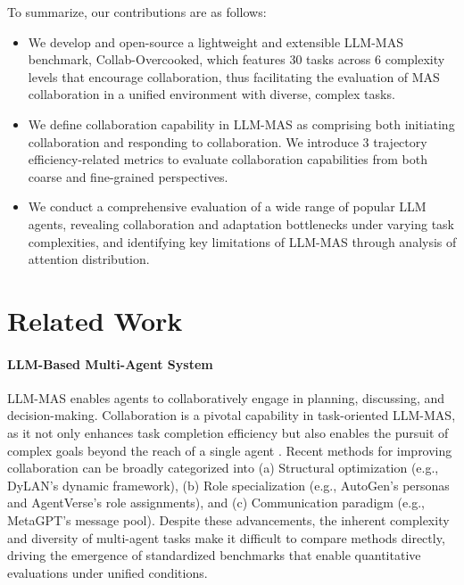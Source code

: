 \documentclass[11pt]{article}
\begin{document}
To summarize, our contributions are as follows:
\begin{itemize} 
\item[$\bullet$] We develop and open-source a lightweight and extensible LLM-MAS benchmark, Collab-Overcooked, which features 30 tasks across 6 complexity levels that encourage collaboration, thus facilitating the evaluation of MAS collaboration in a unified environment with diverse, complex tasks.

\item[$\bullet$] We define collaboration capability in LLM-MAS as comprising both initiating collaboration and responding to collaboration. We introduce 3 trajectory efficiency-related metrics to evaluate collaboration capabilities from both coarse and fine-grained perspectives.

\item[$\bullet$] We conduct a comprehensive evaluation of a wide range of popular LLM agents, revealing collaboration and adaptation bottlenecks under varying task complexities, and identifying key limitations of LLM-MAS through analysis of attention distribution.
\end{itemize}







\section{Related Work}

\paragraph{LLM-Based Multi-Agent System}

LLM-MAS enables agents to collaboratively engage in planning, discussing,  and decision-making. Collaboration is a pivotal capability in task-oriented LLM-MAS, as it not only enhances task completion efficiency \cite{zhang2024towards,tao2024github} but also enables the pursuit of complex goals beyond the reach of a single agent \cite{park2023generative,hong2023metagpt}. Recent methods for improving collaboration can be broadly categorized into (a) Structural optimization (e.g., DyLAN’s \cite{liu2023dynamic} dynamic framework), (b) Role specialization (e.g., AutoGen’s \cite{wu2023autogen} personas and AgentVerse's \cite{chen2023agentverse} role assignments), and (c) Communication paradigm (e.g., MetaGPT's \cite{hong2023metagpt} message pool). Despite these advancements, the inherent complexity and diversity of multi-agent tasks make it difficult to compare methods directly, driving the emergence of standardized benchmarks that enable quantitative evaluations under unified conditions.
\end{document}
